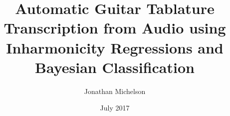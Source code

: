 \documentclass[12pt]{cmuthesis}
\begin{document}
 
\frontmatter

\pagestyle{empty}

\title{ %
{\bf Automatic Guitar Tablature Transcription from Audio using Inharmonicity Regressions and Bayesian Classification}}
\author{Jonathan Michelson}
\date{July 2017}
\trnumber{}


\support{}
\disclaimer{}



\maketitle


\pagestyle{plain} %

\end{document}
